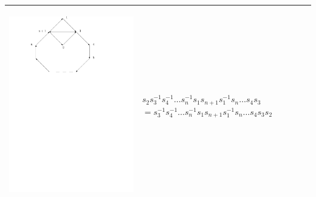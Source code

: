\documentclass[11pt]{amsart}
\theoremstyle{definition}
\begin{document}
\begin{table}[h]
\begin{tabular}{| p{3.5cm} | p{7cm} |}
\begin{center}\includegraphics[scale = .30]{Diagram2.pdf}\end{center} 
& $s_{2}s_{3}^{-1}s_{4}^{-1}\dots s_{n}^{-1}s_{1}s_{n+1}s_{1}^{-1}s_{n} \dots s_{4}s_{3}$
\newline $= s_{3}^{-1}s_{4}^{-1}\dots s_{n}^{-1}s_{1}s_{n+1}s_{1}^{-1}s_{n} \dots s_{4}s_{3}s_{2}$\\ \hline


\end{tabular}
\end{table}
\end{document}
